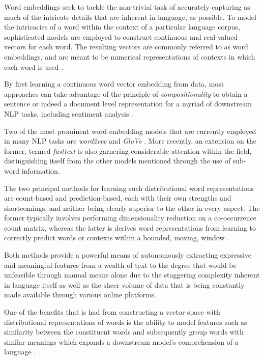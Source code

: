 \documentclass[../../fyp.tex]{subfiles}
\begin{document}
Word embeddings seek to tackle the non-trivial task of accurately capturing as much of the intricate details that are inherent in language, as possible. To model the intricacies of a word within the context of a particular language corpus, sophisticated models are employed to construct continuous and real-valued vectors for each word. The resulting vectors are commonly referred to as word embeddings, and are meant to be numerical representations of contexts in which each word is used \citep*{bengio2003,mikolov2013,pennington,tang}.

By first learning a continuous word vector embedding from data, most approaches can take advantage of the principle of \textit{compositionality} \cite{frege1892} to obtain a sentence or indeed a document level representation for a myriad of downstream NLP tasks, including sentiment analysis \citep*{bengio2003,mikolov2013,pennington}.

Two of the most prominent word embedding models that are currently employed in many NLP tasks are \textit{word2vec} \cite{mikolov2013} and \textit{GloVe} \cite{pennington}. More recently, an extension on the former, termed \textit{fasttext} \cite{bojanowski2017} is also garnering considerable attention within the field, distinguishing itself from the other models mentioned through the use of sub-word information.

The two principal methods for learning such distributional word representations are count-based and prediction-based, each with their own strengths and shortcomings, and neither being clearly superior to the other in every aspect. The former typically involves performing dimensionality reduction on a co-occurrence count matrix, whereas the latter is derives word representations from learning to correctly predict words or contexts within a bounded, moving, window \cite{pennington}.

Both methods provide a powerful means of autonomously extracting expressive and meaningful features from a wealth of text to the degree that would be unfeasible through manual means alone due to the staggering complexity inherent in language itself as well as the sheer volume of data that is being constantly made available through various online platforms.

One of the benefits that is had from constructing a vector space with distributional representations of words is the ability to model features such as similarity between the constituent words and subsequently group words with similar meanings which expands a downstream model's comprehension of a language \cite{mikolov2013b}.
\end{document}
